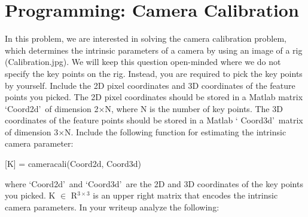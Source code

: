 \documentclass[11pt]{article}
\author{Ian Chen}
\date{\today}
\begin{document}
    \section{Programming: Camera Calibration}
    In this problem, we are interested in solving the camera calibration problem, which determines the intrinsic
    parameters of a camera by using an image of a rig (Calibration.jpg). We will keep this question open-minded where
    we do not specify the key points on the rig. Instead, you are required to pick the key points by yourself.
    Include the 2D pixel coordinates and 3D coordinates of the feature points you picked. The 2D pixel coordinates
    should be stored in a Matlab matrix \textquoteleft Coord2d\textquoteright\ of dimension 2$\times$N, where N is the
    number
    of key points. The 3D coordinates of the feature points should be stored in a Matlab \textquoteleft
    Coord3d\textquoteright\ matrix of dimension 3$\times$N. Include the following function for estimating the intrinsic
    camera
    parameter:
    \begin{center}
    [K]
        = cameracali(Coord2d, Coord3d)
    \end{center}
    where \textquoteleft Coord2d\textquoteright\ and \textquoteleft Coord3d\textquoteright\ are the 2D and 3D
    coordinates
    of the key points you picked. K $\in$ R$^{3\times3}$ is an upper right matrix that encodes the intrinsic camera
    parameters.\newline
    In your writeup analyze the following:
\end{document}
